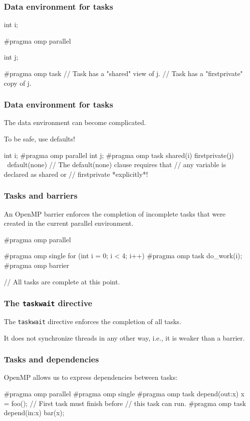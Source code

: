 \documentclass[12pt,t]{beamer}
\let\emph\relax %
\begin{document}
  \begin{frame}[fragile]
    \frametitle{Data environment for tasks}

    \begin{code}
int i;

#pragma omp parallel
{
  int j;

  #pragma omp task
  {
    // Task has a "shared" view of j.
    // Task has a "firstprivate" copy of j.
  }
}
    \end{code}
  \end{frame}

  \begin{frame}[fragile]
    \frametitle{Data environment for tasks}

    The data environment can become complicated.

    To be safe, use defaults!

    \begin{code}
int i;
#pragma omp parallel
{
  int j;
  #pragma omp task shared(i) firstprivate(j) \
                   default(none)
  {
    // The default(none) clause requires that
    // any variable is declared as shared or
    // firstprivate *explicitly*!
  }
}
    \end{code}
  \end{frame}

  \begin{frame}[fragile]
    \frametitle{Tasks and barriers}

    An OpenMP barrier enforces the completion of \emph{all} incomplete tasks that were created in the current parallel environment.

    \begin{code}
#pragma omp parallel
{
  #pragma omp single
  for (int i = 0; i < 4; i++) {
    #pragma omp task
    do_work(i);
  }
  #pragma omp barrier

  // All tasks are complete at this point.
}
    \end{code}
  \end{frame}

  \begin{frame}[fragile]
    \frametitle{The \texttt{taskwait} directive}

    The \texttt{taskwait} directive enforces the completion of all \emph{child} tasks.

    It does not synchronize threads in any other way, i.e., it is weaker than a barrier.
  \end{frame}

  \begin{frame}[fragile]
    \frametitle{Tasks and dependencies}

    OpenMP allows us to express dependencies between tasks:
    \begin{code}
#pragma omp parallel
{
  #pragma omp single
  {
    #pragma omp task depend(out:x)
    x = foo();
    // First task must finish before
    // this task can run.
    #pragma omp task depend(in:x)
    bar(x);
  }
}
    \end{code}
  \end{frame}
\end{document}
